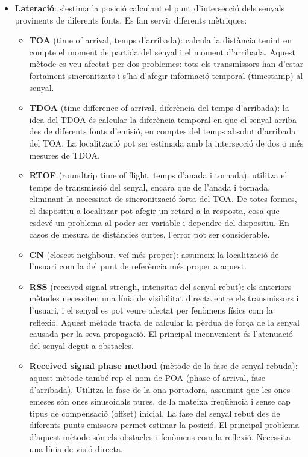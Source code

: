 \begin{itemize}

    \item \textbf{Lateració}: s'estima la posició calculant el punt d’intersecció dels senyals provinents de diferents fonts. Es fan servir diferents mètriques:

    \begin{itemize}
        \item \textbf{TOA} (time of arrival, temps d'arribada): calcula la distància tenint en compte el moment de partida del senyal i el moment d'arribada. Aquest mètode es veu afectat per dos problemes: tots els transmissors han d'estar fortament sincronitzats i s'ha d'afegir informació temporal (timestamp) al senyal.
        \item \textbf{TDOA} (time difference of arrival, diferència del temps d'arribada): la idea del TDOA és calcular la diferència temporal en que el senyal arriba des de diferents fonts d’emisió, en comptes del temps absolut d'arribada del TOA. La localització pot ser estimada amb la intersecció de dos o més mesures de TDOA.
        \item \textbf{RTOF} (roundtrip time of flight, temps d'anada i tornada): utilitza el temps de transmissió del senyal, encara que de l'anada i tornada, eliminant la necessitat de sincronització forta del TOA. De totes formes, el dispositiu a localitzar pot afegir un retard a la resposta, cosa que esdevé un problema al poder ser variable i dependre del dispositiu. En casos de mesura de distàncies curtes, l'error pot ser considerable.
        \item \textbf{CN} (closest neighbour, veí més proper): assumeix la localització de l’usuari com la del punt de referència més proper a aquest.
        \item \textbf{RSS} (received signal strengh, intensitat del senyal rebut): els anteriors mètodes necessiten una línia de visibilitat directa entre els transmissors i l'usuari, i el senyal es pot veure afectat per fenòmens físics com la reflexió. Aquest mètode tracta de calcular la pèrdua de força de la senyal causada per la seva propagació. El principal inconvenient és l'atenuació del senyal degut a obstacles.
        \item \textbf{Received signal phase method} (mètode de la fase de senyal rebuda): aquest mètode també rep el nom de POA (phase of arrival, fase d'arribada). Utilitza la fase de la ona portadora, assumint que les ones emeses són ones sinusoidals pures, de la mateixa freqüència i sense cap tipus de compensació (offset) inicial. La fase del senyal rebut des de diferents punts emissors permet estimar la posició. El principal problema d'aquest mètode són els obstacles i fenòmens com la reflexió. Necessita una línia de visió directa.


\end{itemize}
\end{itemize}
